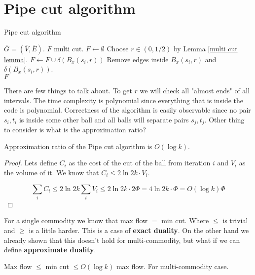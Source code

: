 \section{Pipe cut algorithm}

\begin{algorithm}[!h]
	\caption{Pipe cut algorithm}
	\begin{algorithmic}[1]
		\Require $\bar{G} = (\bar{V}, \bar{E})$.
		\Ensure $F$ multi cut.
		\State $F \gets \emptyset$
				\State Choose $r \in (0, 1/2)$ by Lemma \ref{multi cut lemma}.
				\State $F \gets F \cup \delta(B_{x}(s_{i}, r))$
				\State Remove edges inside $B_{x}(s_{i}, r)$ and $\delta(B_{x}(s_{i}, r))$.
			\EndIf
		\EndFor \\
		\Return $F$
	\end{algorithmic}
\end{algorithm}



There are few things to talk about. To get $r$ we will check all "almost ends" of all intervals. The time complexity is polynomial since everything that is inside the code is polynomial. Correctness of the algorithm is easily observable since no pair $s_{i},t_{i}$ is inside some other ball and all balls will separate pairs $s_{j}, t_{j}$. Other thing to consider is what is the approximation ratio?

\begin{thm}
	Approximation ratio of the Pipe cut algorithm is $O(\log k)$.
\end{thm}

\begin{proof}
	Lets define $C_{i}$ as the cost of the cut of the ball from iteration $i$ and $V_{i}$ as the volume of it. We know that $C_{i} \leq 2 \ln 2k \cdot V_{i}$.
	
	$$
	\sum_{i} C_{i} \leq 2 \ln 2k \sum_{i}V_{i} \leq 2 \ln 2k \cdot 2 \Phi = 4 \ln 2k \cdot \Phi = O (\log k) \Phi
	$$
\end{proof}

For a single commodity we know that max flow $=$ min cut. Where $\leq$ is trivial and $\geq$ is a little harder. This is a case of \textbf{exact duality}. On the other hand we already shown that this doesn't hold for multi-commodity, but what if we can define \textbf{approximate duality}.

\begin{cor}
	Max flow $\leq$ min cut $\leq O(\log k)$ max flow. For multi-commodity case.
\end{cor}

